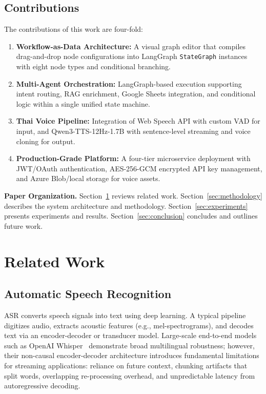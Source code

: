 \documentclass[10pt, a4paper, twocolumn]{article}
\begin{document}
\subsection{Contributions}
The contributions of this work are four-fold:
\begin{enumerate}[label=(\roman*)]
    \item \textbf{Workflow-as-Data Architecture:} A visual graph editor that compiles drag-and-drop node configurations into LangGraph \texttt{StateGraph} instances with eight node types and conditional branching.
    \item \textbf{Multi-Agent Orchestration:} LangGraph-based execution supporting intent routing, RAG enrichment, Google Sheets integration, and conditional logic within a single unified state machine.
    \item \textbf{Thai Voice Pipeline:} Integration of Web Speech API with custom VAD for input, and Qwen3-TTS-12Hz-1.7B with sentence-level streaming and voice cloning for output.
    \item \textbf{Production-Grade Platform:} A four-tier microservice deployment with JWT/OAuth authentication, AES-256-GCM encrypted API key management, and Azure Blob/local storage for voice assets.
\end{enumerate}

\noindent\textbf{Paper Organization.}
Section~\ref{sec:related} reviews related work.
Section~\ref{sec:methodology} describes the system architecture and methodology.
Section~\ref{sec:experiments} presents experiments and results.
Section~\ref{sec:conclusion} concludes and outlines future work.

\section{Related Work}
\label{sec:related}

\subsection{Automatic Speech Recognition}
ASR converts speech signals into text using deep learning.
A typical pipeline digitizes audio, extracts acoustic features (e.g., mel-spectrograms), and decodes text via an encoder-decoder or transducer model.
Large-scale end-to-end models such as OpenAI Whisper~\cite{radford2022whisper} demonstrate broad multilingual robustness; however, their non-causal encoder-decoder architecture introduces fundamental limitations for streaming applications: reliance on future context, chunking artifacts that split words, overlapping re-processing overhead, and unpredictable latency from autoregressive decoding.
\end{document}
